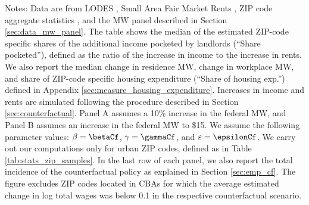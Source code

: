 \begin{table}[hbt!]
    \begin{minipage}{.95\textwidth} \footnotesize
        \vspace{2mm}
        Notes: 
        Data are from LODES \parencite{CensusLODES}, 
        Small Area Fair Market Rents \parencite{hudSAFMR},
        ZIP code aggregate statistics \parencite{IRS}, and
        the MW panel described in Section \ref{sec:data_mw_panel}.
        The table shows the median of the estimated ZIP-code specific shares of 
        the additional income pocketed by landlords (``Share pocketed''), 
        defined as the ratio of the increase in income to the increase in rents. 
        We also report the median change in residence MW, change in workplace MW,
        and share of ZIP-code specific housing expenditure 
        (``Share of housing exp.'') defined in Appendix 
        \ref{sec:measure_housing_expenditure}.
        Increases in income and rents are simulated following the procedure 
        described in Section \ref{sec:counterfactual}.
        Panel A assumes a 10\% increase in the federal MW, and
        Panel B assumes an increase in the federal MW to \$15.
        We assume the following parameter values:
        $\beta = \betaCf$, $\gamma = \gammaCf$, and $\varepsilon = \epsilonCf$.
        We carry out our computations only for urban ZIP codes, defined as 
        in Table \ref{tab:stats_zip_samples}.
        In the last row of each panel, we also report the total incidence of the 
        counterfactual policy as explained in Section \ref{sec:emp_cf}.
        The figure excludes ZIP codes located in CBAs for which the average
        estimated change in log total wages was below 0.1 in the respective
        counterfactual scenario.
    \end{minipage}
\end{table}
